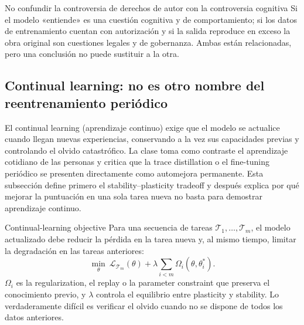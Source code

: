\begin{warningbox}{No confundir la controversia de derechos de autor con la controversia cognitiva}
Si el modelo «entiende» es una cuestión cognitiva y de comportamiento; si los datos de entrenamiento cuentan con autorización y si la salida reproduce en exceso la obra original son cuestiones legales y de gobernanza. Ambas están relacionadas, pero una conclusión no puede sustituir a la otra.
\end{warningbox}

\subsection{Continual learning: no es otro nombre del reentrenamiento periódico}

El continual learning (aprendizaje continuo) exige que el modelo se actualice cuando llegan nuevas experiencias, conservando a la vez sus capacidades previas y controlando el olvido catastrófico. La clase toma como contraste el aprendizaje cotidiano de las personas y critica que la trace distillation o el fine-tuning periódico se presenten directamente como automejora permanente. Esta subsección define primero el stability--plasticity tradeoff y después explica por qué mejorar la puntuación en una sola tarea nueva no basta para demostrar aprendizaje continuo.


\begin{importantbox}{Continual-learning objective}
Para una secuencia de tareas $\mathcal{T}_1,\ldots,\mathcal{T}_m$, el modelo actualizado debe reducir la pérdida en la tarea nueva y, al mismo tiempo, limitar la degradación en las tareas anteriores:
\[
\min_\theta\ \mathcal{L}_{\mathcal{T}_m}(\theta)+
\lambda\sum_{i<m}\Omega_i(\theta,\theta_{i}^{*}).
\]
$\Omega_i$ es la regularization, el replay o la parameter constraint que preserva el conocimiento previo, y $\lambda$ controla el equilibrio entre plasticity y stability. Lo verdaderamente difícil es verificar el olvido cuando no se dispone de todos los datos anteriores.
\end{importantbox}


